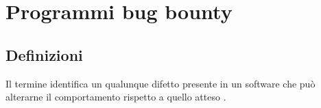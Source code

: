 %
%
%
%
%
%
%

\section{Programmi bug bounty}

%
%

\subsection{Definizioni}

Il termine \bug identifica un qualunque difetto presente in un software che può alterarne il comportamento rispetto a quello atteso \cite{fryer2017bugbounty, bettini2021tdd15}.

